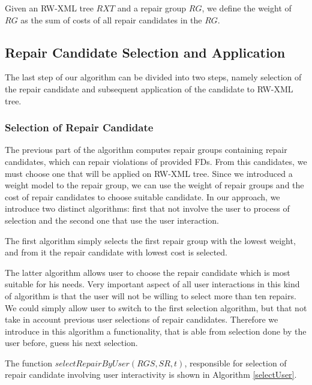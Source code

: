 \begin{define}
Given an RW-XML tree $RXT$ and a repair group $RG$, we define the weight of $RG$ as the sum of costs of all repair candidates in the $RG$.
\end{define}

\subsection{Repair Candidate Selection and Application}

The last step of our algorithm can be divided into two steps, namely selection of the repair candidate and subsequent application of the candidate to RW-XML tree.

\subsubsection{Selection of Repair Candidate}

The previous part of the algorithm computes repair groups containing repair candidates, which can repair violations of provided FDs. From this candidates, we must choose one that will be applied on RW-XML tree. Since we introduced a weight model to the repair group, we can use the weight of repair groups and the cost of repair candidates to choose suitable candidate. In our approach, we introduce two distinct algorithms: first that not involve the user to process of selection and the second one that use the user interaction.

The first algorithm simply selects the first repair group with the lowest weight, and from it the repair candidate with lowest cost is selected.

The latter algorithm allows user to choose the repair candidate which is most suitable for his needs. Very important aspect of all user interactions in this kind of algorithm is that the user will not be willing to select more than ten repairs. We could simply allow user to switch to the first selection algorithm, but that not take in account previous user selections of repair candidates. Therefore we introduce in this algorithm a functionality, that is able from selection done by the user before, guess his next selection.

The function $selectRepairByUser(RGS, SR, t)$, responsible for selection of repair candidate involving user interactivity is shown in Algorithm \ref{selectUser}.

